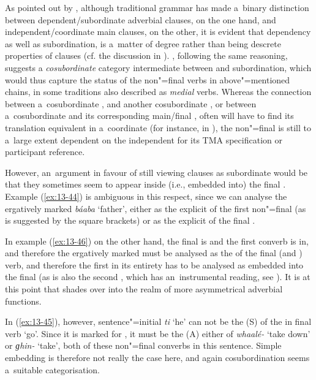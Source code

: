 As pointed out by \citet[327-8]{givon2001b}, although traditional grammar has made a~binary distinction between dependent/subordinate adverbial clauses, on the one hand, and independent/coordinate main clauses, on the other, it is evident that dependency as well as subordination, is a~matter of degree rather than being descrete properties of clauses (cf.  the discussion in \citet[]{cristofaro2005}). \citet[20--27]{haspelmath1995}, following the same reasoning, suggests a \textit{cosubordinate} category intermediate between  and subordination, which would thus capture the status of the non"=final verbs in above"=mentioned chains, in some traditions also described as \textit{medial} verbs. Whereas the connection between a~cosubordinate , and another cosubordinate , or between a~cosubordinate  and its corresponding main/final , often will have to find its translation equivalent in a~coordinate  (for instance, in ), the non"=final  is still to a~large extent dependent on the independent  for its TMA specification or participant reference.



However, an~argument in favour of still viewing  clauses as subordinate would be that they sometimes seem to appear inside (i.e., embedded into) the final . Example (\ref{ex:13-44}) is ambiguous in this respect, since we can analyse the ergatively marked \textit{báaba} `father', either as the explicit  of the first non"=final   (as is suggested by the square brackets) or as the explicit  of the final  . 



In example (\ref{ex:13-46}) on the other hand, the final  is  and the first converb is in, and therefore the ergatively marked  must be analysed as the  of the final (and ) verb, and therefore the first   in its entirety has to be analysed as embedded into the final  (as is also the second  , which has an~instrumental reading, see ). It is at this point that  shades over into the realm of more asymmetrical adverbial functions. 



In (\ref{ex:13-45}), however, sentence"=initial \textit{ti} `he' can not be the  (S) of the in final verb `go'. Since it is marked for , it must be the  (A) either of  \textit{whaalé-} `take down' or  \textit{ɡhin-} `take', both of these non"=final converbs in this sentence. Simple embedding is therefore not really the case here, and again cosubordination seems a~suitable categorisation. 




